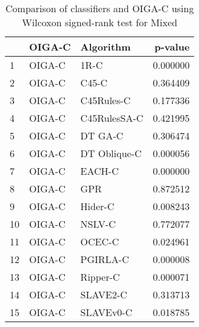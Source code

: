 \begin{table}
\footnotesize
\caption{Comparison of classifiers and OIGA-C using Wilcoxon signed-rank test for Mixed}
\label{tab:OIGA-C wilcoxon Mixed comparison}
\begin{tabular}{lllr}
\hline
 & OIGA-C & Algorithm & p-value \\
\hline
1 & OIGA-C & 1R-C & 0.000000 \\
2 & OIGA-C & C45-C & 0.364409 \\
3 & OIGA-C & C45Rules-C & 0.177336 \\
4 & OIGA-C & C45RulesSA-C & 0.421995 \\
5 & OIGA-C & DT GA-C & 0.306474 \\
6 & OIGA-C & DT Oblique-C & 0.000056 \\
7 & OIGA-C & EACH-C & 0.000000 \\
8 & OIGA-C & GPR & 0.872512 \\
9 & OIGA-C & Hider-C & 0.008243 \\
10 & OIGA-C & NSLV-C & 0.772077 \\
11 & OIGA-C & OCEC-C & 0.024961 \\
12 & OIGA-C & PGIRLA-C & 0.000008 \\
13 & OIGA-C & Ripper-C & 0.000071 \\
14 & OIGA-C & SLAVE2-C & 0.313713 \\
15 & OIGA-C & SLAVEv0-C & 0.018785 \\
\hline
\end{tabular}
\end{table}

